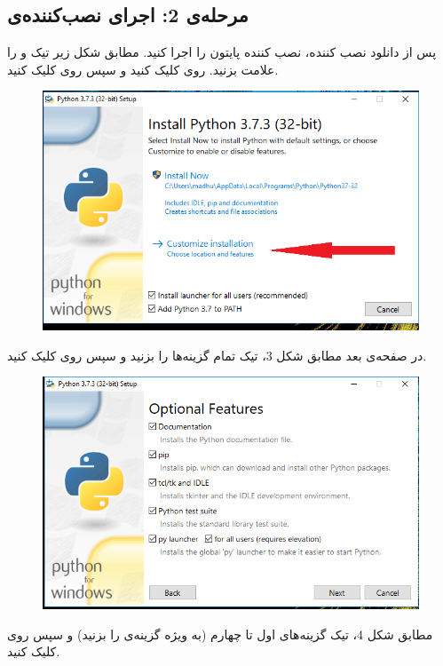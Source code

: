 \documentclass{article}
\begin{document}
\subsection{مرحله‌ی 2: اجرای نصب‌کننده‌ی }
پس از دانلود نصب کننده، نصب کننده پایتون را اجرا کنید. مطابق شکل زیر تیک  و  را علامت بزنید. روی  کلیک کنید و سپس روی  کلیک کنید.
\begin{figure}[H]
    \centering
    \includegraphics[width=1.0\textwidth]{figures/2.png}
    \caption
	{}
    \label{fig:fig1}
\end{figure}
در صفحه‌ی بعد مطابق شکل 3، تیک تمام گزینه‌ها را بزنید و سپس روی  کلیک کنید.
\begin{figure}[H]
    \centering
    \includegraphics[width=1.0\textwidth]{figures/3.png}
    \caption
	{}
    \label{fig:fig1}
\end{figure}
مطابق شکل 4، تیک گزینه‌های اول تا چهارم (به ویژه گزینه‌ی  را بزنید) و سپس روی  کلیک کنید.
\end{document}
